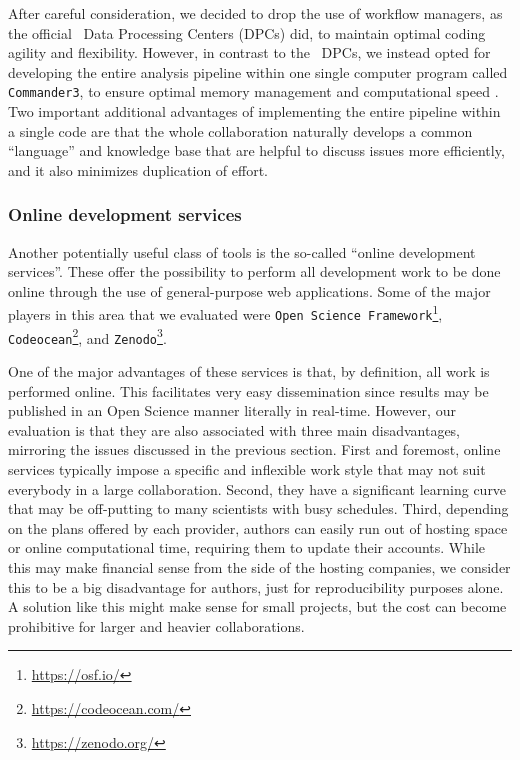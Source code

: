 \documentclass[twocolumn]{openjournal}
\def\commanderthree{\texttt{Commander3}}
\begin{document}
After careful consideration, we decided to drop the use of workflow managers,
as the official \Planck\ Data Processing Centers (DPCs) did, to maintain
optimal coding agility and flexibility. However, in contrast to the \Planck\
DPCs, we instead opted for developing the entire analysis pipeline within one
single computer program called \commanderthree, to ensure optimal memory
management and computational speed \citep{bp03}. Two important additional
advantages of implementing the entire pipeline within a single code are that
the whole collaboration naturally develops a common ``language'' and knowledge
base that are helpful to discuss issues more efficiently, and it also minimizes
duplication of effort.


\subsubsection{Online development services}

Another potentially useful class of tools is the so-called ``online development
services''. These offer the possibility to perform all development work to be
done online through the use of general-purpose web applications. Some of the
major players in this area that we evaluated were \texttt{Open Science
Framework}\footnote{\url{https://osf.io/}},
\texttt{Codeocean}\footnote{\url{https://codeocean.com/}}, and
\texttt{Zenodo}\footnote{\url{https://zenodo.org/}}.

One of the major advantages of these services is that, by definition, all work
is performed online. This facilitates very easy dissemination since results may
be published in an Open Science manner literally in real-time. However, our
evaluation is that they are also associated with three main disadvantages,
mirroring the issues discussed in the previous section. First and foremost,
online services typically impose a specific and inflexible work style that may
not suit everybody in a large collaboration. Second, they have a significant
learning curve that may be off-putting to many scientists with busy schedules.
Third, depending on the plans offered by each provider, authors can easily run
out of hosting space or online computational time, requiring them to update
their accounts. While this may make financial sense from the side of the
hosting companies, we consider this to be a big disadvantage for authors, just
for reproducibility purposes alone. A solution like this might make sense for
small projects, but the cost can become prohibitive for larger and heavier
collaborations.
\end{document}
